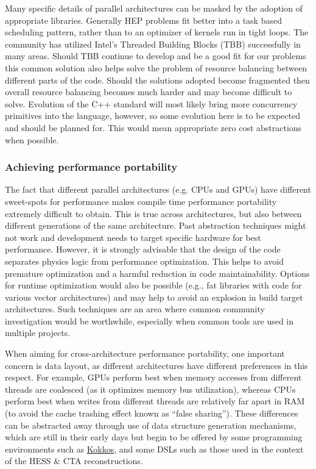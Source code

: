 \documentclass[12pt,a4paper]{article}
\begin{document}
Many specific details of parallel architectures can be masked by the
adoption of appropriate libraries. Generally HEP problems fit better
into a task based scheduling pattern, rather than to an optimizer of
kernels run in tight loops. The community has utilized Intel's Threaded
Building Blocks (TBB) successfully in many areas. Should TBB continue to
develop and be a good fit for our problems this common solution also
helps solve the problem of resource balancing between different parts of
the code. Should the solutions adopted become fragmented then overall
resource balancing becomes much harder and may become difficult to
solve. Evolution of the C++ standard will most likely bring more
concurrency primitives into the language, however, so some evolution
here is to be expected and should be planned for. This would mean
appropriate zero cost abstractions when possible.

\hypertarget{achieving-performance-portability}{%
\subsubsection{Achieving performance
portability~}\label{achieving-performance-portability}}

The fact that different parallel architectures (e.g. CPUs and GPUs) have
different sweet-spots for performance makes compile time performance
portability extremely difficult to obtain. This is true across
architectures, but also between different generations of the same
architecture. Past abstraction techniques might not work and development
needs to target specific hardware for best performance. However, it is
strongly advisable that the design of the code separates physics logic
from performance optimization. This helps to avoid premature
optimization and a harmful reduction in code maintainability. Options
for runtime optimization would also be possible (e.g., fat libraries
with code for various vector architectures) and may help to avoid an
explosion in build target architectures. Such techniques are an area
where common community investigation would be worthwhile, especially
when common tools are used in multiple projects.

When aiming for cross-architecture performance portability, one
important concern is data layout, as different architectures have
different preferences in this respect. For example, GPUs perform best
when memory accesses from different threads are coalesced (as it
optimizes memory bus utilization), whereas CPUs perform best when writes
from different threads are relatively far apart in RAM (to avoid the
cache trashing effect known as ``false sharing''). These differences can
be abstracted away through use of data structure generation mechanisms,
which are still in their early days but begin to be offered by some
programming environments such as
\href{https://github.com/kokkos/kokkos}{{Kokkos}}, and some DSLs such as
those used in the context of the HESS \& CTA reconstructions.
\end{document}
